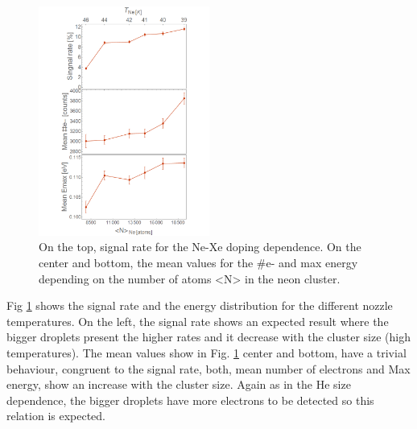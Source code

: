 \begin{figure}[hbtp]
\centering
\includegraphics[width=0.5\textwidth]{../Images/results/MIR_Ne_DropletSize/alltogether.png}
\caption[MIR Ne size dependence. Signal rate and mean values]{On the top, signal rate for the Ne-Xe doping dependence. On the center and bottom, the mean values for the $\#$e- and max energy depending on the number of atoms <N> in the neon cluster.}
\label{fig:Nesizeall}
\end{figure}

Fig \ref{fig:Nesizeall} shows the signal rate and the energy distribution for the different nozzle temperatures. On the left, the signal rate shows an expected result where the bigger droplets present the higher rates and it decrease with the cluster size (high temperatures). The mean values show in Fig. \ref{fig:Nesizeall} center and bottom, have a trivial behaviour, congruent to the signal rate, both, mean number of electrons and Max energy, show an increase   with the cluster size. Again as in the He size dependence, the bigger droplets have more electrons to be detected so this relation is expected.

%


